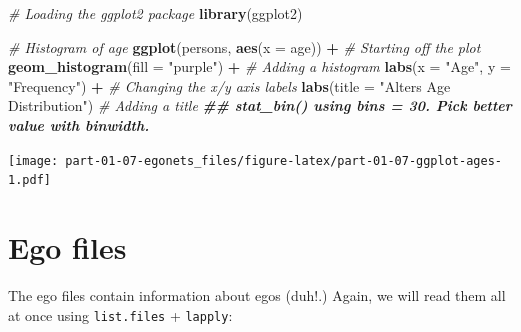 \documentclass[
]{book}
\newenvironment{Shaded}{\begin{snugshade}}{\end{snugshade}}
\newcommand{\AttributeTok}[1]{\textcolor[rgb]{0.13,0.29,0.53}{#1}}
\newcommand{\CommentTok}[1]{\textcolor[rgb]{0.56,0.35,0.01}{\textit{#1}}}
\newcommand{\DocumentationTok}[1]{\textcolor[rgb]{0.56,0.35,0.01}{\textbf{\textit{#1}}}}
\newcommand{\FunctionTok}[1]{\textcolor[rgb]{0.13,0.29,0.53}{\textbf{#1}}}
\newcommand{\NormalTok}[1]{#1}
\newcommand{\SpecialCharTok}[1]{\textcolor[rgb]{0.81,0.36,0.00}{\textbf{#1}}}
\newcommand{\StringTok}[1]{\textcolor[rgb]{0.31,0.60,0.02}{#1}}
\begin{document}
\begin{Shaded}
\begin{Highlighting}[]
\CommentTok{\# Loading the ggplot2 package}
\FunctionTok{library}\NormalTok{(ggplot2)}

\CommentTok{\# Histogram of age}
\FunctionTok{ggplot}\NormalTok{(persons, }\FunctionTok{aes}\NormalTok{(}\AttributeTok{x =}\NormalTok{ age)) }\SpecialCharTok{+}            \CommentTok{\# Starting off the plot}
  \FunctionTok{geom\_histogram}\NormalTok{(}\AttributeTok{fill =} \StringTok{"purple"}\NormalTok{) }\SpecialCharTok{+}      \CommentTok{\# Adding a histogram}
  \FunctionTok{labs}\NormalTok{(}\AttributeTok{x =} \StringTok{"Age"}\NormalTok{, }\AttributeTok{y =} \StringTok{"Frequency"}\NormalTok{) }\SpecialCharTok{+}       \CommentTok{\# Changing the x/y axis labels}
  \FunctionTok{labs}\NormalTok{(}\AttributeTok{title =} \StringTok{"Alter\textquotesingle{}s Age Distribution"}\NormalTok{) }\CommentTok{\# Adding a title}
\DocumentationTok{\#\# \textasciigrave{}stat\_bin()\textasciigrave{} using \textasciigrave{}bins = 30\textasciigrave{}. Pick better value with \textasciigrave{}binwidth\textasciigrave{}.}
\end{Highlighting}
\end{Shaded}

\texttt{[image: part-01-07-egonets\_files/figure-latex/part-01-07-ggplot-ages-1.pdf]}

\hypertarget{ego-files}{%
\section{Ego files}\label{ego-files}}

The ego files contain information about egos (duh!.) Again, we will read them all at once using \texttt{list.files} + \texttt{lapply}:
\end{document}
